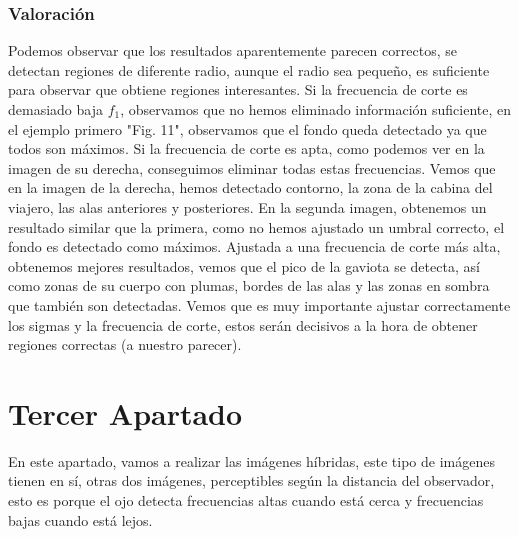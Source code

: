 \documentclass{article}
\begin{document}
\subsubsection{Valoración}
Podemos observar que los resultados aparentemente parecen correctos, se detectan regiones de diferente radio, aunque el radio sea pequeño, es suficiente para observar que obtiene regiones interesantes.
\newline
\newline
Si la frecuencia de corte es demasiado baja $f_1$, observamos que no hemos eliminado información suficiente, en el ejemplo primero "Fig. 11", observamos que el fondo queda detectado ya que todos son máximos. Si la frecuencia de corte es apta, como podemos ver en la imagen de su derecha, conseguimos eliminar todas estas frecuencias. Vemos que en la imagen de la derecha, hemos detectado contorno, la zona de la cabina del viajero, las alas anteriores y posteriores.
\newline
\newline
En la segunda imagen, obtenemos un resultado similar que la primera, como no hemos ajustado un umbral correcto, el fondo es detectado como máximos. Ajustada a una frecuencia de corte más alta, obtenemos mejores resultados, vemos que el pico de la gaviota se detecta, así como zonas de su cuerpo con plumas, bordes de las alas y las zonas en sombra  que también son detectadas.
\newline
\newline
Vemos que es muy importante ajustar correctamente los sigmas y la frecuencia de corte, estos serán decisivos a la hora de obtener regiones correctas (a nuestro parecer).

\newpage

\section{Tercer Apartado}
En este apartado, vamos a realizar las imágenes híbridas, este tipo de imágenes tienen en sí, otras dos imágenes, perceptibles según la distancia del observador, esto es porque el ojo detecta frecuencias altas cuando está cerca y frecuencias bajas cuando está lejos.
\end{document}
